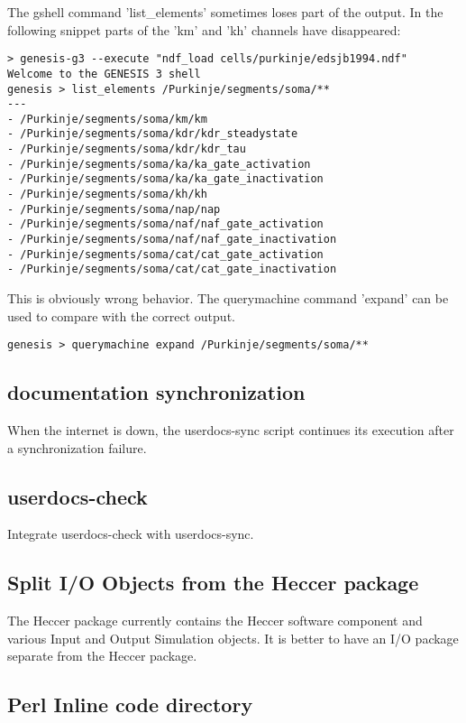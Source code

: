 \documentclass[12pt]{article}
\begin{document}
The gshell command 'list\_elements' sometimes loses part of the
output.  In the following snippet parts of the 'km' and 'kh' channels
have disappeared:


\begin{verbatim}
> genesis-g3 --execute "ndf_load cells/purkinje/edsjb1994.ndf"
Welcome to the GENESIS 3 shell
genesis > list_elements /Purkinje/segments/soma/**
---
- /Purkinje/segments/soma/km/km
- /Purkinje/segments/soma/kdr/kdr_steadystate
- /Purkinje/segments/soma/kdr/kdr_tau
- /Purkinje/segments/soma/ka/ka_gate_activation
- /Purkinje/segments/soma/ka/ka_gate_inactivation
- /Purkinje/segments/soma/kh/kh
- /Purkinje/segments/soma/nap/nap
- /Purkinje/segments/soma/naf/naf_gate_activation
- /Purkinje/segments/soma/naf/naf_gate_inactivation
- /Purkinje/segments/soma/cat/cat_gate_activation
- /Purkinje/segments/soma/cat/cat_gate_inactivation
\end{verbatim}

This is obviously wrong behavior.  The querymachine command 'expand'
can be used to compare with the correct output.

\begin{verbatim}
genesis > querymachine expand /Purkinje/segments/soma/**
\end{verbatim}


\subsection{documentation synchronization}

When the internet is down, the userdocs-sync script continues its
execution after a synchronization failure.


\subsection{userdocs-check}

Integrate userdocs-check with userdocs-sync.


\subsection{Split I/O Objects from the Heccer package}

The Heccer package currently contains the Heccer software component
and various Input and Output Simulation objects.  It is better to have
an I/O package separate from the Heccer package.


\subsection{Perl Inline code directory}
\end{document}
